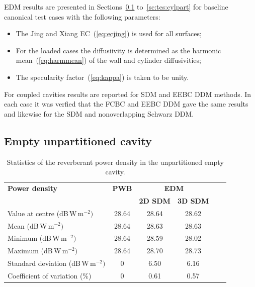 \documentclass[a4paper]{article}
\numberwithin{equation}{section}
\begin{document}
EDM results are presented in Sections~\ref{sc:res:unpartempty} to~\ref{sc:tcs:cylpart} for baseline canonical 
test cases with the following
parameters:
\begin{itemize}
 \item The Jing and Xiang EC~(\ref{eq:ecjing}) is used for all surfaces;
 \item For the loaded cases the diffusiivity is determined as the harmonic mean~(\ref{eq:harmmean}) of the wall and cylinder
 diffusivities;
 \item The specularity factor~(\ref{eq:kappa}) is taken to be unity.
\end{itemize}
For coupled cavities results are reported for SDM and EEBC DDM methods. In each case it was verfied
that the FCBC and EEBC DDM gave the same results and likewise for the SDM and nonoverlapping Schwarz
DDM.

\subsection[Empty unpartitioned cavity]{Empty unpartitioned cavity}
\label{sc:res:unpartempty}

\begin{table}[ht]
\begin{center}
\begin{tabular}{|l|c|c|c|c|c|}
\hline
\textbf{Power density}               &\textbf{PWB} &\multicolumn{2}{|c|}{\textbf{EDM}} \\ \cline{3-4}
{}                                   &{}           &\textbf{2D SDM} &\textbf{3D SDM}  \\
\hline
Value at centre (dB\,W\,m$^{-2})$    &28.64        &28.64           &28.62 \\
Mean (dB\,W\,m$^{-2})$               &28.64        &28.63           &28.63 \\
Minimum (dB\,W\,m$^{-2})$            &28.64        &28.59           &28.02 \\
Maximum (dB\,W\,m$^{-2})$            &28.64        &28.70           &28.73 \\
Standard deviation (dB\,W\,m$^{-2})$ &0            &6.50            &6.16  \\
Coefficient of variation (\%)        &0            &0.61            &0.57  \\
\hline
\end{tabular}
\end{center}
\caption{\label{tb:unpartempty} Statistics of the reverberant power density in the unpartitioned empty cavity.}
\end{table}
\end{document}
